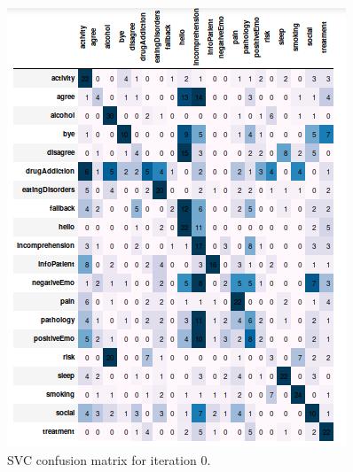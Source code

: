 \documentclass[11pt]{article}
\begin{document}
\begin{figure}[h]
	\centering
	\includegraphics[scale=0.7]{svc0_cm.png}
	\caption{SVC confusion matrix for iteration 0.}
\label{svc_cm_0}
\end{figure}
\FloatBarrier
\end{document}
